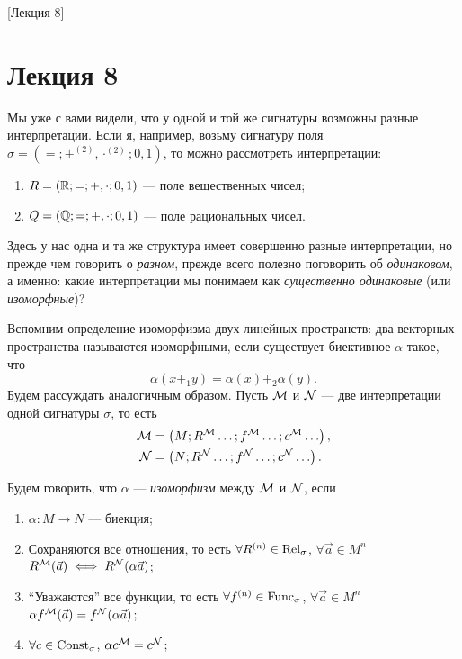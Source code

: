 [Лекция 8]

\section{Лекция 8}

Мы уже с вами видели, что у одной и той же сигнатуры возможны разные интерпретации.
Если я, например, возьму сигнатуру поля $\sigma = \left( =; +^{(2)}, \cdot^{(2)}; 0, 1 \right)$, то можно рассмотреть интерпретации:
\begin{enumerate}
    \item $R = \left( \mathbb{R}; =; +, \cdot; 0, 1 \right)$ --- поле вещественных чисел;
    \item $Q = \left( \mathbb{Q}; =; +, \cdot; 0, 1 \right)$ --- поле рациональных чисел. 
\end{enumerate}
Здесь у нас одна и та же структура имеет совершенно разные интерпретации, но прежде чем говорить о {\it разном}, прежде всего полезно поговорить об {\it одинаковом}, а именно: какие интерпретации мы понимаем как {\it существенно одинаковые} (или {\it изоморфные})?

Вспомним определение изоморфизма двух линейных пространств: два векторных пространства называются изоморфными, если существует биективное $\alpha$ такое, что
$$
    \alpha(x +_{1} y) = \alpha(x) +_{2} \alpha(y).
$$
Будем рассуждать аналогичным образом.
Пусть $\mathcal{M}$ и $\mathcal{N}$ --- две интерпретации одной сигнатуры $\sigma$, то есть
\begin{align}
    \mathcal{M} &= \left( M; R^{\mathcal{M}} \ldots; f^{\mathcal{M}} \ldots; c^{\mathcal{M}} \ldots \right), \\
    \mathcal{N} &= \left( N; R^{\mathcal{N}} \ldots; f^{\mathcal{N}} \ldots; c^{\mathcal{N}} \ldots \right).
\end{align}

\begin{definition} \label{def::isomorphism-on-structures}
    Будем говорить, что $\alpha$ --- {\it изоморфизм} между $\mathcal{M}$ и $\mathcal{N}$, если
    \begin{enumerate}
        \item $\alpha \colon M \to N$ --- биекция;
        \item Сохраняются все отношения, то есть $\forall R^{(n)} \in \mathrm{Rel}_{\sigma}$, $\forall \vec{a} \in M^{n}$ $R^{\mathcal{M}}(\vec{a}) \iff R^{\mathcal{N}}(\alpha \vec{a})$;
        \item \enquote{Уважаются} все функции, то есть $\forall f^{(n)} \in \mathrm{Func}_{\sigma}$, $\forall \vec{a} \in M^{n}$ $\alpha f^{\mathcal{M}}(\vec{a}) = f^{\mathcal{N}}(\alpha \vec{a})$;
        \item $\forall c \in \mathrm{Const}_{\sigma}$, $\alpha c^{\mathcal{M}} = c^{\mathcal{N}}$;
    \end{enumerate}
\end{definition}

